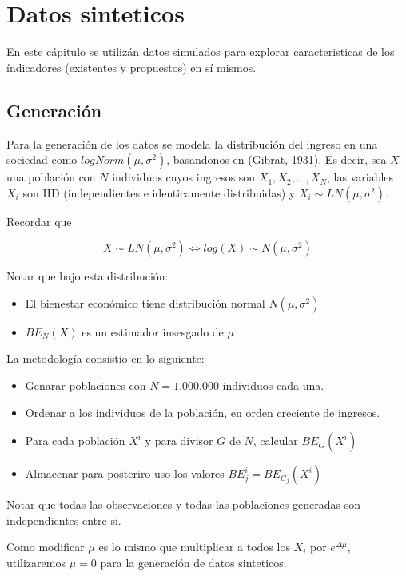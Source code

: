 \chapter{Datos sinteticos}

En este cápitulo se utilizán datos simulados para explorar caracteristicas de los índicadores (existentes y propuestos) en sí mismos.

\section{Generación}

Para la generación de los datos se modela la distribución del ingreso en una sociedad como $logNorm(\mu,\sigma^2)$, basandonos en (Gibrat, 1931)\cite{gibrat1931inégalités}. Es decir, sea $X$ una población con $N$ individuos cuyos ingresos son $X_1, X_2, \dots, X_N$, las variables $X_i$ son IID (independientes e identicamente distribuidas) y $X_i \sim LN(\mu, \sigma^2)$.

Recordar que 

$$
    X \sim LN(\mu, \sigma^2) \iff log(X) \sim N(\mu,\sigma^2)
$$

Notar que bajo esta distribución:

\begin{itemize}
    \item El bienestar económico tiene distribución normal $N(\mu,\sigma^2)$
    \item $BE_N(X)$ es un estimador insesgado de $\mu$
\end{itemize}

La metodología consistio en lo siguiente:

\begin{itemize}
    \item Genarar poblaciones con $N = 1.000.000$ individuos cada una.
    \item Ordenar a los individuos de la población, en orden creciente de ingresos.
    \item Para cada población $X^i$ y para divisor $G$ de $N$, calcular $BE_G(X^i)$
    \item Almacenar para posteriro uso los valores $BE_j^i = BE_{G_j}(X^i)$
\end{itemize}

Notar que todas las observaciones y todas las poblaciones generadas son independientes entre si.

Como modificar $\mu$ es lo mismo que multiplicar a todos los $X_i$ por $e^{\Delta \mu}$, utilizaremos $\mu = 0$ para la generación de datos sinteticos.

